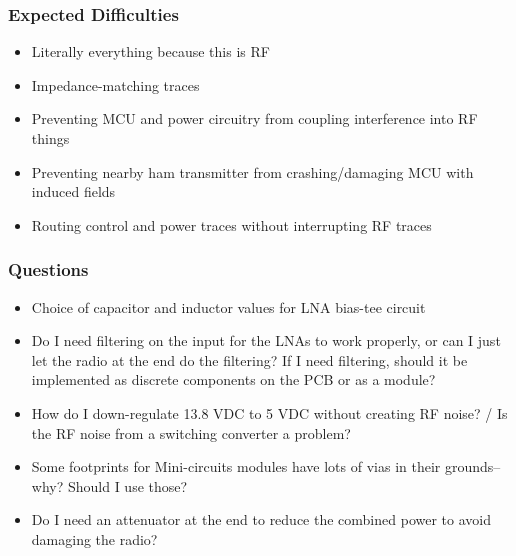 \documentclass{beamer}
\begin{document}
    \begin{frame}
        \frametitle{Expected Difficulties}

        \begin{itemize}
            \item Literally everything because this is RF

            \item Impedance-matching traces

            \item Preventing MCU and power circuitry from coupling interference into RF things

            \item Preventing nearby ham transmitter from crashing/damaging MCU with induced fields

            \item Routing control and power traces without interrupting RF traces
        \end{itemize}
    \end{frame}

    \begin{frame}
        \frametitle{Questions}

        \begin{itemize}
            \item Choice of capacitor and inductor values for LNA bias-tee circuit

            \item Do I need filtering on the input for the LNAs to work properly, or can I just let the radio at the end do the filtering? If I need filtering, should it be implemented as discrete components on the PCB or as a module?

            \item How do I down-regulate 13.8 VDC to 5 VDC without creating RF noise? / Is the RF noise from a switching converter a problem?

            \item Some footprints for Mini-circuits modules have lots of vias in their grounds--why? Should I use those?

            \item Do I need an attenuator at the end to reduce the combined power to avoid damaging the radio?
        \end{itemize}
    \end{frame}
\end{document}
